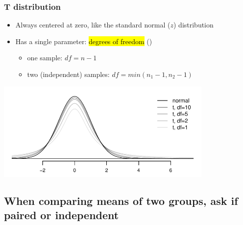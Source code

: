 \documentclass[11pt,containsverbatim,handout,xcolor=xelatex,dvipsnames,table]{beamer}
\newcommand{\soln}[1]{}
\begin{document}
\begin{frame}
\frametitle{T distribution}

\begin{itemize}

\item Always centered at zero, like the standard normal ($z$) distribution

\pause

\item Has a single parameter: \hl{degrees of freedom} ()
\begin{itemize}
\item one sample: $df = n - 1$
\item two (independent) samples: $df = min(n_1 - 1, n_2 - 1)$
\end{itemize}

\end{itemize}

\begin{center}
\includegraphics[width=0.8\textwidth]{figures/tDistConvergeToNormalDist/tDistConvergeToNormalDist}
\end{center}

\pause


\soln{\pause Approaches normal.}

\end{frame}


\subsection{When comparing means of two groups, ask if paired or independent}
\label{mi2}

\end{document}
